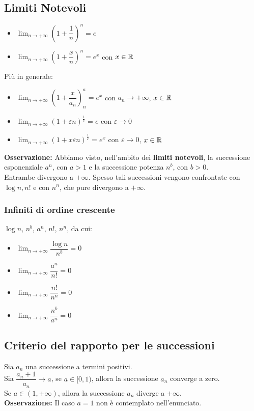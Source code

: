 \subsection{Limiti Notevoli}
\begin{itemize}
    \item $\lim_{n\to+\infty} (1+\dfrac{1}{n})^n = e$
    \item $\lim_{n\to+\infty} (1+\dfrac{x}{n})^n = e^x$ con $x \in \mathbb{R}$
\end{itemize}
Più in generale:
\begin{itemize}
    \item $\lim_{n\to+\infty} (1+\dfrac{x}{a_n})^a_n = e^x$ con $a_n \to +\infty$, $x \in \mathbb{R}$
    \item $\lim_{n\to+\infty} (1+\varepsilon n)^{\frac{1}{\varepsilon}} = e$ con $\varepsilon \to 0$
    \item $\lim_{n\to+\infty} (1+x\varepsilon n)^{\frac{1}{\varepsilon}} = e^x$ con $\varepsilon \to 0$, $x \in \mathbb{R}$
\end{itemize}
\textbf{Osservazione:} Abbiamo visto, nell'ambito dei \textbf{limiti notevoli}, la successione esponenziale $a^n$, con $a > 1$ e la successione potenza $n^b$, con $b > 0$.\\
Entrambe divergono a $+\infty$. Spesso tali successioni vengono confrontate con $\log n, n!$ e con $n^n$, che pure divergono a $+\infty$.\\

\subsubsection{Infiniti di ordine crescente}
$\log n$, $n^b$, $a^n$, $n!$, $n^n$, da cui:
\begin{itemize}
    \item $\lim_{n\to+\infty} \dfrac{\log n}{n^b} = 0$
    \item $\lim_{n\to+\infty} \dfrac{a^n}{n!} = 0$
    \item $\lim_{n\to+\infty} \dfrac{n!}{n^n} = 0$
    \item $\lim_{n\to+\infty} \dfrac{n^b}{a^n} = 0$
\end{itemize}

\subsection{Criterio del rapporto per le successioni}
Sia $a_n$ una successione a termini positivi.\\ Sia $\dfrac{a_n+1}{a_n} \to a$,
se $a \in [0, 1)$, allora la successione $a_n$ converge a zero.\\ Se $a \in (1,
    +\infty)$, allora la successione $a_n$ diverge a $+\infty$.\\
\textbf{Osservazione:} Il caso $a = 1$ non è contemplato nell'enunciato.

